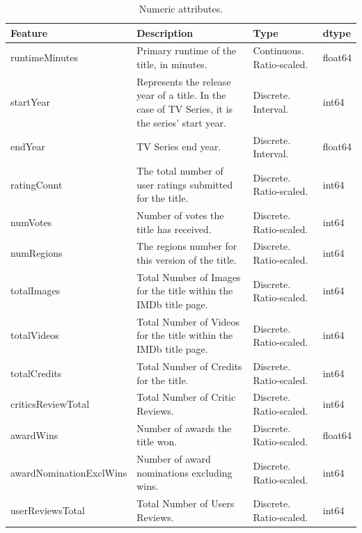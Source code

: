 \begin{table}
    \centering
    \renewcommand{\arraystretch}{1.2}
    \scriptsize
    \begin{tabular}{p{3cm}p{7.5cm}p{3cm}p{0.7cm}}
    \toprule
    \textbf{Feature} & \textbf{Description} & \textbf{Type} & \textbf{dtype} \\ \midrule
    runtimeMinutes & Primary runtime of the title, in minutes. & Continuous. Ratio-scaled. & float64 \\
    startYear & Represents the release year of a title. In the case of TV Series, it is the series' start year. & Discrete. Interval. & int64 \\
    endYear & TV Series end year. & Discrete. Interval. & float64 \\
    ratingCount & The total number of user ratings submitted for the title. & Discrete. Ratio-scaled. & int64 \\
    numVotes & Number of votes the title has received. & Discrete. Ratio-scaled. & int64 \\
    numRegions & The regions number for this version of the title. & Discrete. Ratio-scaled. & int64 \\
    totalImages & Total Number of Images for the title within the IMDb title page. & Discrete. Ratio-scaled. & int64 \\
    totalVideos & Total Number of Videos for the title within the IMDb title page. & Discrete. Ratio-scaled. & int64 \\
    totalCredits & Total Number of Credits for the title. & Discrete. Ratio-scaled. & int64 \\
    criticsReviewTotal & Total Number of Critic Reviews. & Discrete. Ratio-scaled. & int64 \\
    awardWins & Number of awards the title won. & Discrete. Ratio-scaled. & float64 \\
    awardNominationExclWins & Number of award nominations excluding wins. & Discrete. Ratio-scaled. & int64 \\
    userReviewsTotal & Total Number of Users Reviews. & Discrete. Ratio-scaled. & int64 \\ \bottomrule
    \end{tabular}
    \caption{Numeric attributes.}
    \label{tab:original_vars_num}
\end{table}

